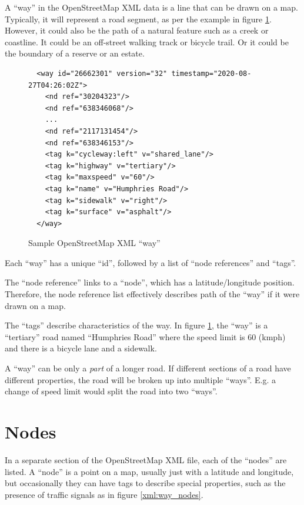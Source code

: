 \documentclass[11pt,twoside]{report}
\begin{document}
A ``way'' in the OpenStreetMap XML data is a line that can be drawn on a map.  Typically, it will represent a road segment, as per the example in figure \ref{xml:way_st}.  However, it could also be the path of a natural feature such as a creek or coastline.  It could be an off-street walking track or bicycle trail.  Or it could be the boundary of a reserve or an estate.

\begin{figure}[t]
\centering
\begin{verbatim}
  <way id="26662301" version="32" timestamp="2020-08-27T04:26:02Z">
    <nd ref="30204323"/>
    <nd ref="638346068"/>
    ...
    <nd ref="2117131454"/>
    <nd ref="638346153"/>
    <tag k="cycleway:left" v="shared_lane"/>
    <tag k="highway" v="tertiary"/>
    <tag k="maxspeed" v="60"/>
    <tag k="name" v="Humphries Road"/>
    <tag k="sidewalk" v="right"/>
    <tag k="surface" v="asphalt"/>
  </way>
\end{verbatim}
\caption{Sample OpenStreetMap XML ``way''}
\label{xml:way_st}
\end{figure}

Each ``way'' has a unique ``id'', followed by a list of ``node references'' and ``tags''.

The ``node reference'' links to a ``node'', which has a latitude/longitude position.  Therefore, the node reference list effectively describes path of the ``way'' if it were drawn on a map.

The ``tags'' describe characteristics of the way.  In figure \ref{xml:way_st}, the ``way'' is a ``tertiary'' road named ``Humphries Road'' where the speed limit is 60 (kmph) and there is a bicycle lane and a sidewalk.

A ``way'' can be only a \textit{part} of a longer road.  If different sections of a road have different properties, the road will be broken up into multiple ``ways''.  E.g. a change of speed limit would split the road into two ``ways''.

\clearpage
\section{Nodes}
\label{osm:nodes}

In a separate section of the OpenStreetMap XML file, each of the ``nodes'' are listed.  A ``node'' is a point on a map, usually just with a latitude and longitude, but occasionally they can have tags to describe special properties, such as the presence of traffic signals as in figure \ref{xml:way_nodes}.\\
\end{document}
